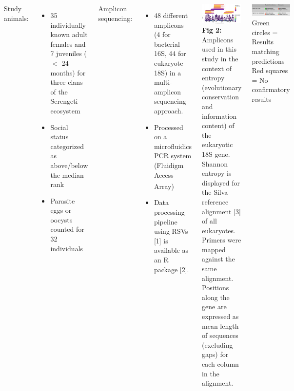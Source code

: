 \documentclass[30pt, a0paper, portrait, margin=0mm, innermargin=15mm,
               blockverticalspace=15mm, colspace=15mm, subcolspace=8mm]{tikzposter}
\begin{document}
\begin{columns}
      {
        Study animals:
        \begin{itemize}
        \item 35 individually known adult females and 7 juveniles ($<$
          24 months) for three clans of the Serengeti ecosystem
        \item Social status categorized as above/below the median rank
        \item Parasite eggs or oocysts counted for 32 individuals
        \end{itemize}
        Amplicon sequencing:
        \begin{itemize}
        \item{48 different amplicons (4 for bacterial 16S, 44 for
          eukaryote 18S) in a multi-amplicon sequencing approach.}
        \item{Processed on a microfluidics PCR system (Fluidigm Access
          Array\textsuperscript{\textregistered})}
        \item{Data processing pipeline using RSVs [1] is available as
          an R package [2].}
        \end{itemize}
        \includegraphics[width=1\linewidth]{entropy_primers_norm_woName.png}
        \textbf{Fig 2:} Amplicons used in this study in the context of
        entropy (evolutionary conservation and information content) of
        the eukaryotic 18S gene. Shannon entropy is displayed for the
        Silva reference alignment [3] of all eukaryotes. Primers were
        mapped against the same alignment. Positions along the gene
        are expressed as mean length of sequences (excluding gaps) for
        each column in the alignment.
      }

      


{
    \includegraphics[scale=0.85]{summary.png}\\
    Green circles = Results matching predictions \hspace{1cm}
    Red squares = No confirmatory results
}


\end{columns}
\end{document}

